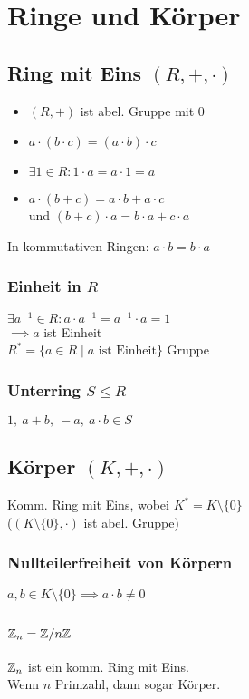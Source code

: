 \section*{Ringe und Körper}

\subsection*{Ring mit Eins $(R,+,\cdot)$}
\begin{itemize}
	\item $(R,+)$ ist abel. Gruppe mit $0$
	\item $a\cdot(b\cdot c) = (a\cdot b)\cdot c$
	\item $\exists 1\in R: 1\cdot a = a \cdot 1 = a$
	\item $a \cdot (b+c)=a\cdot b + a\cdot c$ \\
		und $(b+c)\cdot a = b\cdot a + c \cdot a$
\end{itemize}
In kommutativen Ringen: $a\cdot b=b \cdot a$

\subsubsection*{Einheit in $R$}
$\exists a^{-1}\in R: a\cdot a^{-1}=a^{-1}\cdot a = 1$ \\
$\implies a$ ist Einheit \\
$R^* = \{a\in R \mid a \text{ ist Einheit}\}$ Gruppe

\subsubsection*{Unterring $S\le R$}
$1,~ a+b,~ -a,~ a\cdot b \in S$

\subsection*{Körper $(K,+,\cdot)$}
Komm. Ring mit Eins, wobei $K^* = K\setminus\{0\}$ \\
($(K\setminus\{0\},\cdot)$ ist abel. Gruppe)

\subsubsection*{Nullteilerfreiheit von Körpern}
$a,b\in K \setminus\{0\} \implies a\cdot b \neq 0$

\subsection*{$\mathbb{Z}_n=\mathbb{Z} / n\mathbb{Z}$}
$\mathbb{Z}_n$ ist ein komm. Ring mit Eins. \\
Wenn $n$ Primzahl, dann sogar Körper.

